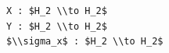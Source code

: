 \documentclass[border=10pt]{standalone}
\begin{document}
\begin{lstlisting}
X : $H_2 \\to H_2$
Y : $H_2 \\to H_2$
$\\sigma_x$ : $H_2 \\to H_2$
\end{lstlisting}
\end{document}
